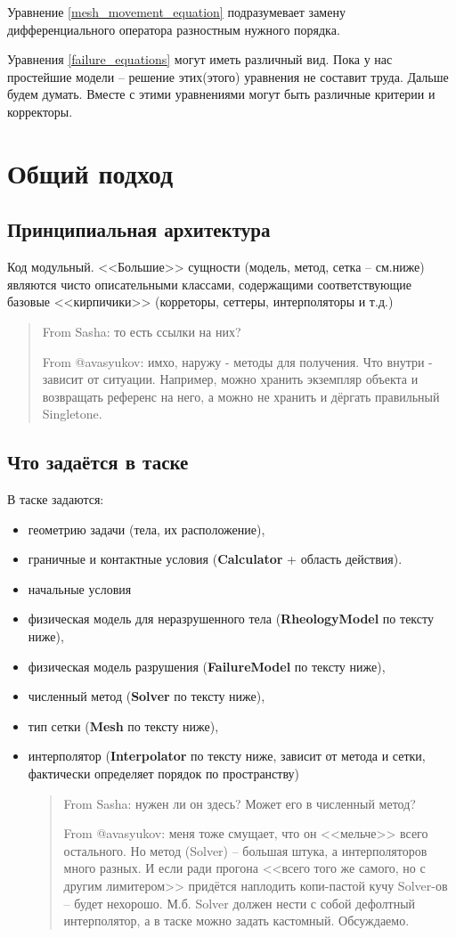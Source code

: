 \documentclass[a4paper,12pt]{article}
\numberwithin{equation}{section}
\begin{document}
	Уравнение \eqref{mesh_movement_equation} подразумевает замену дифференциального оператора разностным нужного порядка.
	
	Уравнения \eqref{failure_equations} могут иметь различный вид. Пока у нас простейшие модели -- решение этих(этого) уравнения не составит труда. Дальше будем думать.
	Вместе с этими уравнениями могут быть различные критерии и корректоры.
	

\section{Общий подход}

\subsection{Принципиальная архитектура}

Код модульный. <<Большие>> сущности (модель, метод, сетка -- см.ниже) являются чисто описательными классами, содержащими соответствующие базовые <<кирпичики>> (корреторы, сеттеры, интерполяторы и т.д.)

\blockquote{
From Sasha: то есть ссылки на них?

From @avasyukov: имхо, наружу - методы для получения. Что внутри - зависит от ситуации. Например, можно хранить экземпляр объекта и возвращать референс на него, а можно не хранить и дёргать правильный Singletone.
}

\subsection{Что задаётся в таске}

В таске задаются:
	\begin{itemize}
		\item{геометрию задачи (тела, их расположение),}
		\item{граничные и контактные условия (\textbf{Calculator} + область действия).}
		\item{начальные условия}
		\item{физическая модель для неразрушенного тела (\textbf{RheologyModel} по тексту ниже),}
		\item{физическая модель разрушения (\textbf{FailureModel} по тексту ниже),}
		\item{численный метод (\textbf{Solver} по тексту ниже),}
		\item{тип сетки (\textbf{Mesh} по тексту ниже),}
		\item{интерполятор (\textbf{Interpolator} по тексту ниже, зависит от метода и сетки, фактически определяет порядок по пространству)

\blockquote{
From Sasha: нужен ли он здесь? Может его в численный метод?

From @avasyukov: меня тоже смущает, что он <<мельче>> всего остального. Но метод (Solver) -- большая штука, а интерполяторов много разных. И если ради прогона <<всего того же самого, но с другим лимитером>> придётся наплодить копи-пастой кучу Solver-ов -- будет нехорошо. М.б. Solver должен нести с собой дефолтный интерполятор, а в таске можно задать кастомный. Обсуждаемо.
}

}
	\end{itemize}
\end{document}
